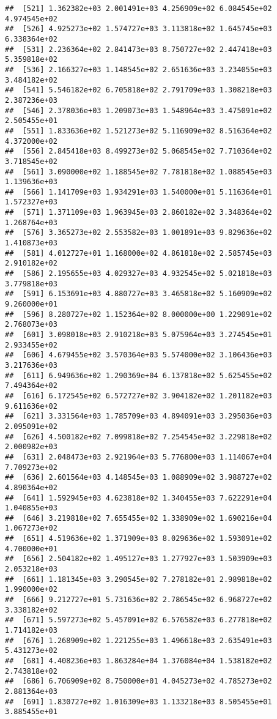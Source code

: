 \documentclass[]{article}
\begin{document}
\begin{verbatim}
##  [521] 1.362382e+03 2.001491e+03 4.256909e+02 6.084545e+02 4.974545e+02
##  [526] 4.925273e+02 1.574727e+03 3.113818e+02 1.645745e+03 6.338364e+02
##  [531] 2.236364e+02 2.841473e+03 8.750727e+02 2.447418e+03 5.359818e+02
##  [536] 2.166327e+03 1.148545e+02 2.651636e+03 3.234055e+03 3.484182e+02
##  [541] 5.546182e+02 6.705818e+02 2.791709e+03 1.308218e+03 2.387236e+03
##  [546] 2.378036e+03 1.209073e+03 1.548964e+03 3.475091e+02 2.505455e+01
##  [551] 1.833636e+02 1.521273e+02 5.116909e+02 8.516364e+02 4.372000e+02
##  [556] 2.845418e+03 8.499273e+02 5.068545e+02 7.710364e+02 3.718545e+02
##  [561] 3.090000e+02 1.188545e+02 7.781818e+02 1.088545e+03 1.139636e+03
##  [566] 1.141709e+03 1.934291e+03 1.540000e+01 5.116364e+01 1.572327e+03
##  [571] 1.371109e+03 1.963945e+03 2.860182e+02 3.348364e+02 1.268764e+03
##  [576] 3.365273e+02 2.553582e+03 1.001891e+03 9.829636e+02 1.410873e+03
##  [581] 4.012727e+01 1.168000e+02 4.861818e+02 2.585745e+03 2.910182e+02
##  [586] 2.195655e+03 4.029327e+03 4.932545e+02 5.021818e+03 3.779818e+03
##  [591] 6.153691e+03 4.880727e+03 3.465818e+02 5.160909e+02 9.260000e+01
##  [596] 8.280727e+02 1.152364e+02 8.000000e+00 1.229091e+02 2.768073e+03
##  [601] 3.098018e+03 2.910218e+03 5.075964e+03 3.274545e+01 2.933455e+02
##  [606] 4.679455e+02 3.570364e+03 5.574000e+02 3.106436e+03 3.217636e+03
##  [611] 6.949636e+02 1.290369e+04 6.137818e+02 5.625455e+02 7.494364e+02
##  [616] 6.172545e+02 6.572727e+02 3.904182e+02 1.201182e+03 9.611636e+02
##  [621] 3.331564e+03 1.785709e+03 4.894091e+03 3.295036e+03 2.095091e+02
##  [626] 4.500182e+02 7.099818e+02 7.254545e+02 3.229818e+02 2.000982e+03
##  [631] 2.048473e+03 2.921964e+03 5.776800e+03 1.114067e+04 7.709273e+02
##  [636] 2.601564e+03 4.148545e+03 1.088909e+02 3.988727e+02 4.890364e+02
##  [641] 1.592945e+03 4.623818e+02 1.340455e+03 7.622291e+04 1.040855e+03
##  [646] 3.219818e+02 7.655455e+02 1.338909e+02 1.690216e+04 1.067273e+02
##  [651] 4.519636e+02 1.371909e+03 8.029636e+02 1.593091e+02 4.700000e+01
##  [656] 2.504182e+02 1.495127e+03 1.277927e+03 1.503909e+03 2.053218e+03
##  [661] 1.181345e+03 3.290545e+02 7.278182e+01 2.989818e+02 1.990000e+02
##  [666] 9.212727e+01 5.731636e+02 2.786545e+02 6.968727e+02 3.338182e+02
##  [671] 5.597273e+02 5.457091e+02 6.576582e+03 6.277818e+02 1.714182e+03
##  [676] 1.268909e+02 1.221255e+03 1.496618e+03 2.635491e+03 5.431273e+02
##  [681] 4.408236e+03 1.863284e+04 1.376084e+04 1.538182e+02 2.743818e+02
##  [686] 6.706909e+02 8.750000e+01 4.045273e+02 4.785273e+02 2.881364e+03
##  [691] 1.830727e+02 1.016309e+03 1.133218e+03 8.505455e+01 3.885455e+01

\end{verbatim}
\end{document}
